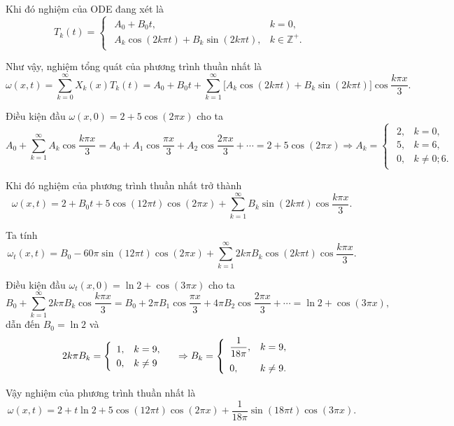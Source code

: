 \documentclass[10pt, a4paper]{article}
\begin{document}
	Khi đó nghiệm của ODE đang xét là $$T_k(t)=\begin{cases}
		\begin{array}{ll}
			A_0+B_0t, & k=0, \\
			A_k\cos(2k\pi t)+B_k\sin(2k\pi t), & k\in\mathbb Z^+.
		\end{array}
	\end{cases}$$
	
	Như vậy, nghiệm tổng quát của phương trình thuần nhất là $$\omega(x,t)=\sum_{k=0}^\infty X_k(x)T_k(t)=A_0+B_0t+\sum_{k=1}^\infty\big[A_k\cos(2k\pi t)+B_k\sin(2k\pi t)\big]\cos\frac{k\pi x}{3}.$$
	
	Điều kiện đầu $\omega(x,0)=2+5\cos(2\pi x)$ cho ta $$A_0+\sum_{k=1}^\infty A_k\cos\frac{k\pi x}{3}=A_0+A_1\cos\frac{\pi x}{3}+A_2\cos\frac{2\pi x}{3}+\cdots=2+5\cos(2\pi x)\Rightarrow A_k=\begin{cases}
		\begin{array}{ll}
			2, & k=0, \\
			5, & k=6, \\
			0, & k\ne0;6.
		\end{array}
	\end{cases}$$
	
	Khi đó nghiệm của phương trình thuần nhất trở thành $$\omega(x,t)=2+B_0t+5\cos(12\pi t)\cos(2\pi x)+\sum_{k=1}^\infty B_k\sin(2k\pi t)\cos\frac{k\pi x}{3}.$$
	
	Ta tính $$\omega_t(x,t)=B_0-60\pi\sin(12\pi t)\cos(2\pi x)+\sum_{k=1}^\infty2k\pi B_k\cos(2k\pi t)\cos\frac{k\pi x}{3}.$$
	
	Điều kiện đầu $\omega_t(x,0)=\ln2+\cos(3\pi x)$ cho ta $$B_0+\sum_{k=1}^\infty2k\pi B_k\cos\frac{k\pi x}{3}=B_0+2\pi B_1\cos\frac{\pi x}{3}+4\pi B_2\cos\frac{2\pi x}{3}+\cdots=\ln2+\cos(3\pi x),$$
	dẫn đến $B_0=\ln2$ và $$2k\pi B_k=\begin{cases}
		\begin{array}{ll}
			1, & k=9, \\
			0, & k\ne9
		\end{array}
	\end{cases}\Rightarrow B_k=\begin{cases}
		\begin{array}{ll}
			\dfrac{1}{18\pi}, & k=9, \\
			\noalign{\vskip5pt}
			0, & k\ne9.
		\end{array}
	\end{cases}$$
	
	Vậy nghiệm của phương trình thuần nhất là $$\omega(x,t)=2+t\ln2+5\cos(12\pi t)\cos(2\pi x)+\frac{1}{18\pi}\sin(18\pi t)\cos(3\pi x).$$
	
\end{document}
